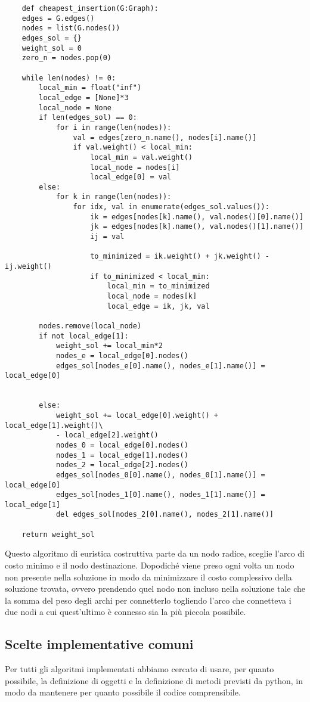 \begin{verbatim}
    def cheapest_insertion(G:Graph):
    edges = G.edges()
    nodes = list(G.nodes())
    edges_sol = {}
    weight_sol = 0
    zero_n = nodes.pop(0)
    
    while len(nodes) != 0:
        local_min = float("inf")
        local_edge = [None]*3
        local_node = None
        if len(edges_sol) == 0:
            for i in range(len(nodes)):
                val = edges[zero_n.name(), nodes[i].name()]
                if val.weight() < local_min:
                    local_min = val.weight()
                    local_node = nodes[i]
                    local_edge[0] = val
        else:
            for k in range(len(nodes)):
                for idx, val in enumerate(edges_sol.values()):
                    ik = edges[nodes[k].name(), val.nodes()[0].name()]
                    jk = edges[nodes[k].name(), val.nodes()[1].name()]
                    ij = val

                    to_minimized = ik.weight() + jk.weight() - ij.weight()
                    if to_minimized < local_min:
                        local_min = to_minimized
                        local_node = nodes[k]
                        local_edge = ik, jk, val

        nodes.remove(local_node)
        if not local_edge[1]:
            weight_sol += local_min*2
            nodes_e = local_edge[0].nodes()
            edges_sol[nodes_e[0].name(), nodes_e[1].name()] = local_edge[0]

            
        else:
            weight_sol += local_edge[0].weight() + local_edge[1].weight()\
            - local_edge[2].weight()
            nodes_0 = local_edge[0].nodes()
            nodes_1 = local_edge[1].nodes()
            nodes_2 = local_edge[2].nodes()
            edges_sol[nodes_0[0].name(), nodes_0[1].name()] = local_edge[0]
            edges_sol[nodes_1[0].name(), nodes_1[1].name()] = local_edge[1]
            del edges_sol[nodes_2[0].name(), nodes_2[1].name()]

    return weight_sol
\end{verbatim}

Questo algoritmo di euristica costruttiva parte da un nodo radice, sceglie l'arco di costo minimo e il nodo destinazione.
Dopodiché viene preso ogni volta un nodo non presente nella soluzione in modo da minimizzare il costo complessivo della soluzione trovata, ovvero prendendo quel nodo non incluso nella soluzione tale che la somma del peso degli archi per connetterlo togliendo l'arco che connetteva i due nodi a cui quest'ultimo è connesso sia la più piccola possibile.

\subsection{Scelte implementative comuni\label{sec:comuni}}
Per tutti gli algoritmi implementati abbiamo cercato di usare, per quanto possibile, la definizione di oggetti e la definizione di metodi previsti da python, in modo da mantenere per quanto possibile il codice comprensibile.